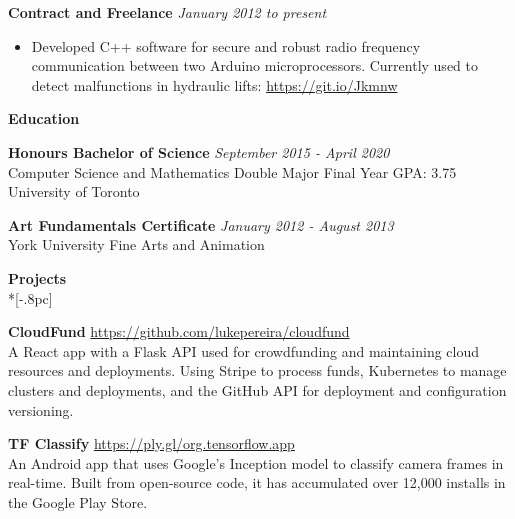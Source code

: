 \documentclass{article}
\begin{document}
{\bf Contract and Freelance} \hfill {\it January 2012 to present\/} 
\begin{itemize}[leftmargin=*]
\itemsep0em
\renewcommand\labelitemi{\tiny$\bullet$}

\item Developed C++ software for secure and robust radio frequency communication between two Arduino microprocessors. Currently used to detect malfunctions in hydraulic lifts: \url{https://git.io/Jkmnw}
\end{itemize}

\vspace{8pt}
{\large \bf Education} \\[-.8pc]
\underline{\hspace{6.1in}} 

{\bf Honours Bachelor of Science} \hfill {\it September 2015 - April 2020} \\
Computer Science and Mathematics Double Major \hfill {Final Year GPA: 3.75}\\
University of Toronto

{\bf Art Fundamentals Certificate} \hfill {\it January 2012 - August 2013 \/} \\
{York University} \hfill {Fine Arts and Animation}

\vspace{8pt}
{\large \bf Projects} \\*[-.8pc]
\underline{\hspace{6.1in}}

\textbf{CloudFund} \hfill \url{https://github.com/lukepereira/cloudfund}\\
A React app with a Flask API used for crowdfunding and maintaining cloud resources and deployments. Using Stripe to process funds, Kubernetes to manage clusters and deployments, and the GitHub API for deployment and configuration versioning.

\textbf{TF Classify} \hfill \url{https://ply.gl/org.tensorflow.app}\\
An Android app that uses Google’s Inception model to classify camera frames in real-time. Built from open-source code, it has accumulated over 12,000 installs in the Google Play Store.
\end{document}
